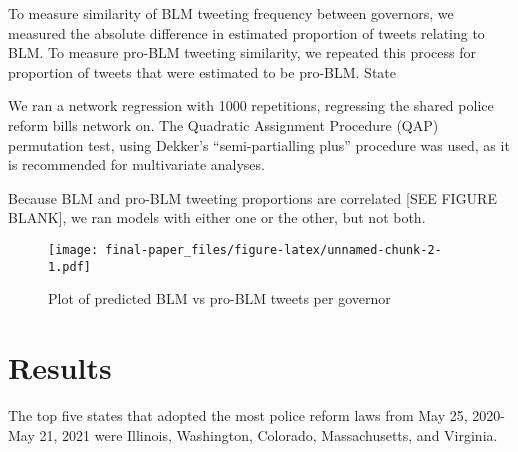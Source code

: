 \documentclass[12pt]{article}
\begin{document}
To measure similarity of BLM tweeting frequency between governors, we
measured the absolute difference in estimated proportion of tweets
relating to BLM. To measure pro-BLM tweeting similarity, we repeated
this process for proportion of tweets that were estimated to be pro-BLM.
State

We ran a network regression with 1000 repetitions, regressing the shared
police reform bills network on. The Quadratic Assignment Procedure (QAP)
permutation test, using Dekker's ``semi-partialling plus'' procedure was
used, as it is recommended for multivariate analyses.

Because BLM and pro-BLM tweeting proportions are correlated {[}SEE
FIGURE BLANK{]}, we ran models with either one or the other, but not
both.

\begin{figure}
\centering
\texttt{[image: final-paper\_files/figure-latex/unnamed-chunk-2-1.pdf]}
\caption{Plot of predicted BLM vs pro-BLM tweets per governor}
\end{figure}

\hypertarget{results}{%
\section{Results}\label{results}}

The top five states that adopted the most police reform laws from May
25, 2020-May 21, 2021 were Illinois, Washington, Colorado,
Massachusetts, and Virginia.
\end{document}

